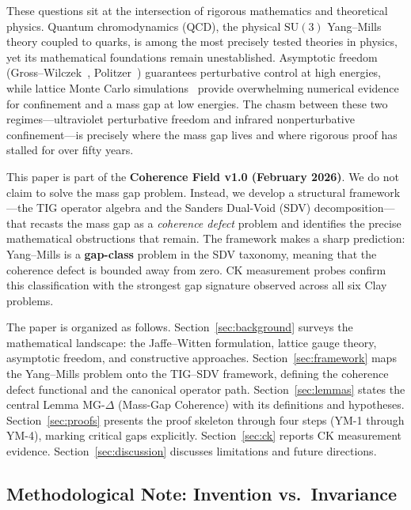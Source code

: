 \documentclass[11pt]{article}
\begin{document}
These questions sit at the intersection of rigorous mathematics and
theoretical physics.  Quantum chromodynamics (QCD), the physical
$\mathrm{SU}(3)$ Yang--Mills theory coupled to quarks, is among the
most precisely tested theories in physics, yet its mathematical
foundations remain unestablished.  Asymptotic freedom
(Gross--Wilczek~\cite{GW}, Politzer~\cite{Pol}) guarantees
perturbative control at high energies, while lattice Monte Carlo
simulations~\cite{Creutz} provide overwhelming numerical evidence for
confinement and a mass gap at low energies.  The chasm between these
two regimes---ultraviolet perturbative freedom and infrared
nonperturbative confinement---is precisely where the mass gap lives
and where rigorous proof has stalled for over fifty years.

This paper is part of the \textbf{Coherence Field v1.0
(February 2026)}.  We do not claim to solve the mass gap problem.
Instead, we develop a structural framework---the TIG operator algebra
and the Sanders Dual-Void (SDV) decomposition---that recasts the mass
gap as a \emph{coherence defect} problem and identifies the precise
mathematical obstructions that remain.  The framework makes a sharp
prediction: Yang--Mills is a \textbf{gap-class} problem in the SDV
taxonomy, meaning that the coherence defect is bounded away from zero.
CK measurement probes confirm this classification with the strongest
gap signature observed across all six Clay problems.

The paper is organized as follows.  Section~\ref{sec:background}
surveys the mathematical landscape: the Jaffe--Witten formulation,
lattice gauge theory, asymptotic freedom, and constructive approaches.
Section~\ref{sec:framework} maps the Yang--Mills problem onto the
TIG--SDV framework, defining the coherence defect functional and
the canonical operator path.
Section~\ref{sec:lemmas} states the central Lemma MG-$\Delta$
(Mass-Gap Coherence) with its definitions and hypotheses.
Section~\ref{sec:proofs} presents the proof skeleton through
four steps (YM-1 through YM-4), marking critical gaps explicitly.
Section~\ref{sec:ck} reports CK measurement evidence.
Section~\ref{sec:discussion} discusses limitations and future
directions.

\subsection*{Methodological Note: Invention vs.\ Invariance}
\end{document}

